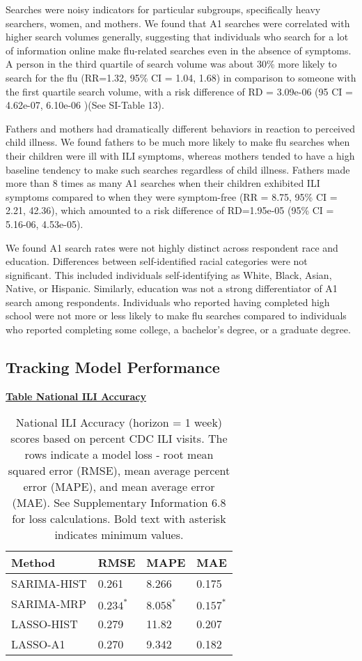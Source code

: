 \documentclass[fleqn,10pt]{wlscirep}
\begin{document}
Searches were noisy indicators for particular subgroups, specifically heavy searchers, women, and mothers. We found that A1 searches were correlated with higher search volumes generally, suggesting that individuals who search for a lot of information online make flu-related searches even in the absence of symptoms. A person in the third quartile of search volume was about 30\% more likely to search for the flu (RR=1.32, 95\% CI = 1.04, 1.68) in comparison to someone with the first quartile search volume, with a risk difference of RD = 3.09e-06 (95 CI = 4.62e-07, 6.10e-06 )(See SI-Table 13). 

Fathers and mothers had dramatically different behaviors in reaction to perceived child illness. We found fathers to be much more likely to make flu searches when their children were ill with ILI symptoms, whereas mothers tended to have a high baseline tendency to make such searches regardless of child illness. Fathers made more than 8 times as many A1 searches when their children exhibited ILI symptoms compared to when they were symptom-free (RR = 8.75, 95\% CI = 2.21, 42.36), which amounted to a risk difference of RD=1.95e-05 (95\% CI = 5.16-06, 4.53e-05).

We found A1 search rates were not highly distinct across respondent race and education. Differences between self-identified racial categories were not significant. This included individuals self-identifying as White, Black, Asian, Native, or Hispanic. Similarly, education was not a strong differentiator of A1 search among respondents. Individuals who reported having completed high school were not more or less likely to make flu searches compared to individuals who reported completing some college, a bachelor's degree, or a graduate degree. 

\subsection*{Tracking Model Performance}

\begin{table}[tbp]
\centering
\textbf{\underline{Table National ILI Accuracy}}\par\medskip
\begin{tabular}{|l|l|l|l|}
\hline
Method        & RMSE  & MAPE  & MAE \\ \hline
SARIMA-HIST       & 0.261 & 8.266 &  0.175 \\ \hline
SARIMA-MRP  & $\mathbf{0.234^*}$ & $\mathbf{8.058^*}$ & $\mathbf{0.157^*}$\\ \hline
LASSO-HIST & 0.279 & 11.82 & 0.207 \\ \hline
LASSO-A1      & 0.270 & 9.342 & 0.182 \\ \hline
\end{tabular}
\caption{National ILI Accuracy (horizon = 1 week) scores based on percent CDC ILI visits. The rows indicate a model loss - root mean squared error (RMSE), mean average percent error (MAPE), and mean average error (MAE). See Supplementary Information 6.8 for loss calculations. Bold text with asterisk indicates minimum values.}
\label{table:mse-national}
\end{table}
\end{document}
